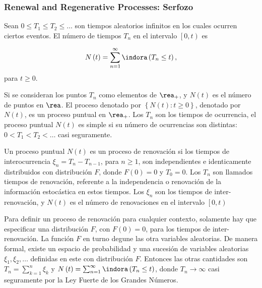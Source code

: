 %
\subsubsection{Renewal and Regenerative Processes: Serfozo\cite{Serfozo}}
%
\begin{Def}%
Sean $0\leq T_{1}\leq T_{2}\leq \ldots$ son tiempos aleatorios infinitos en los cuales ocurren ciertos eventos. El n\'umero de tiempos $T_{n}$ en el intervalo $\left[0,t\right)$ es

\begin{eqnarray}
N\left(t\right)=\sum_{n=1}^{\infty}\indora\left(T_{n}\leq t\right),
\end{eqnarray}
para $t\geq0$.
\end{Def}

Si se consideran los puntos $T_{n}$ como elementos de $\rea_{+}$, y $N\left(t\right)$ es el n\'umero de puntos en $\rea$. El proceso denotado por $\left\{N\left(t\right):t\geq0\right\}$, denotado por $N\left(t\right)$, es un proceso puntual en $\rea_{+}$. Los $T_{n}$ son los tiempos de ocurrencia, el proceso puntual $N\left(t\right)$ es simple si su n\'umero de ocurrencias son distintas: $0<T_{1}<T_{2}<\ldots$ casi seguramente.

\begin{Def}
Un proceso puntual $N\left(t\right)$ es un proceso de renovaci\'on si los tiempos de interocurrencia $\xi_{n}=T_{n}-T_{n-1}$, para $n\geq1$, son independientes e identicamente distribuidos con distribuci\'on $F$, donde $F\left(0\right)=0$ y $T_{0}=0$. Los $T_{n}$ son llamados tiempos de renovaci\'on, referente a la independencia o renovaci\'on de la informaci\'on estoc\'astica en estos tiempos. Los $\xi_{n}$ son los tiempos de inter-renovaci\'on, y $N\left(t\right)$ es el n\'umero de renovaciones en el intervalo $\left[0,t\right)$
\end{Def}


\begin{Note}
Para definir un proceso de renovaci\'on para cualquier contexto, solamente hay que especificar una distribuci\'on $F$, con $F\left(0\right)=0$, para los tiempos de inter-renovaci\'on. La funci\'on $F$ en turno degune las otra variables aleatorias. De manera formal, existe un espacio de probabilidad y una sucesi\'on de variables aleatorias $\xi_{1},\xi_{2},\ldots$ definidas en este con distribuci\'on $F$. Entonces las otras cantidades son $T_{n}=\sum_{k=1}^{n}\xi_{k}$ y $N\left(t\right)=\sum_{n=1}^{\infty}\indora\left(T_{n}\leq t\right)$, donde $T_{n}\rightarrow\infty$ casi seguramente por la Ley Fuerte de los Grandes N\'umeros.
\end{Note}

